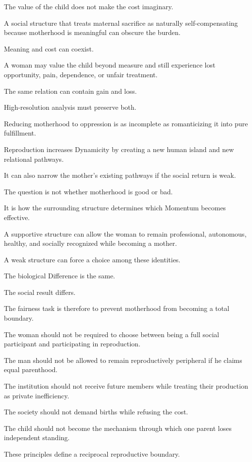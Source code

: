 The value of the child does not make the cost imaginary.

A social structure that treats maternal sacrifice as naturally self-compensating because motherhood is meaningful can obscure the burden.

Meaning and cost can coexist.

A woman may value the child beyond measure and still experience lost opportunity, pain, dependence, or unfair treatment.

The same relation can contain gain and loss.

High-resolution analysis must preserve both.

Reducing motherhood to oppression is as incomplete as romanticizing it into pure fulfillment.

Reproduction increases Dynamicity by creating a new human island and new relational pathways.

It can also narrow the mother’s existing pathways if the social return is weak.

The question is not whether motherhood is good or bad.

It is how the surrounding structure determines which Momentum becomes effective.

A supportive structure can allow the woman to remain professional, autonomous, healthy, and socially recognized while becoming a mother.

A weak structure can force a choice among these identities.

The biological Difference is the same.

The social result differs.

The fairness task is therefore to prevent motherhood from becoming a total boundary.

The woman should not be required to choose between being a full social participant and participating in reproduction.

The man should not be allowed to remain reproductively peripheral if he claims equal parenthood.

The institution should not receive future members while treating their production as private inefficiency.

The society should not demand births while refusing the cost.

The child should not become the mechanism through which one parent loses independent standing.

These principles define a reciprocal reproductive boundary.

